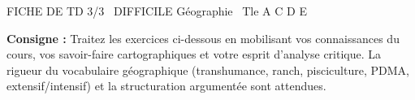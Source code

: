 \documentclass[11pt]{article}
\begin{document}
\begin{tcolorbox}[enhanced,colback=popink,colframe=popink,arc=10pt,boxrule=0pt,left=12pt,right=12pt,top=9pt,bottom=9pt]
{\color{white}\popxbold\small FICHE DE TD 3/3 \textbullet\ DIFFICILE \hfill Géographie \textbullet\ Tle A C D E\par}
\end{tcolorbox}
\vspace{4pt}
\noindent\textbf{Consigne :} Traitez les exercices ci-dessous en mobilisant vos connaissances du cours, vos savoir-faire cartographiques et votre esprit d'analyse critique. La rigueur du vocabulaire géographique (transhumance, ranch, pisciculture, PDMA, extensif/intensif) et la structuration argumentée sont attendues.
\end{document}
